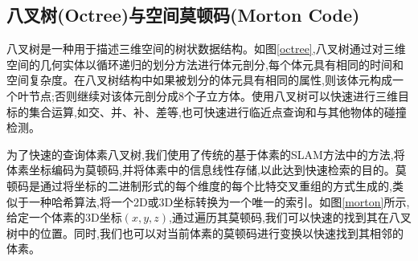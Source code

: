 \subsection{八叉树(Octree)与空间莫顿码(Morton Code)}
\begin{figure}[htbp]
    \centering
    \centering
\end{figure}
八叉树是一种用于描述三维空间的树状数据结构。如图\ref{octree},八叉树通过对三维空间的几何实体以循环递归的划分方法进行体元剖分,每个体元具有相同的时间和空间复杂度。在八叉树结构中如果被划分的体元具有相同的属性,则该体元构成一个叶节点;否则继续对该体元剖分成8个子立方体。使用八叉树可以快速进行三维目标的集合运算,如交、并、补、差等,也可快速进行临近点查询和与其他物体的碰撞检测。

为了快速的查询体素八叉树,我们使用了传统的基于体素的SLAM方法\cite{traditionalslam}中的方法,将体素坐标编码为莫顿码,并将体素中的信息线性存储,以此达到快速检索的目的。莫顿码是通过将坐标的二进制形式的每个维度的每个比特交叉重组的方式生成的,类似于一种哈希算法,将一个2D或3D坐标转换为一个唯一的索引。如图\ref{morton}所示,给定一个体素的3D坐标$(x,y,z)$,通过遍历其莫顿码,我们可以快速的找到其在八叉树中的位置。同时,我们也可以对当前体素的莫顿码进行变换以快速找到其相邻的体素。
